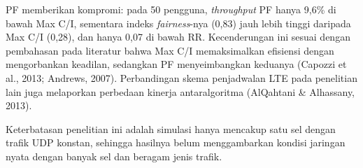 PF memberikan kompromi: pada 50 pengguna, \textit{throughput} PF hanya 9,6\% di bawah Max C/I, sementara indeks \textit{fairness}-nya (0,83) jauh lebih tinggi daripada Max C/I (0,28), dan hanya 0,07 di bawah RR. Kecenderungan ini sesuai dengan pembahasan pada literatur bahwa Max C/I memaksimalkan efisiensi dengan mengorbankan keadilan, sedangkan PF menyeimbangkan keduanya (Capozzi et al., 2013; Andrews, 2007). Perbandingan skema penjadwalan LTE pada penelitian lain juga melaporkan perbedaan kinerja antaralgoritma (AlQahtani \& Alhassany, 2013).

Keterbatasan penelitian ini adalah simulasi hanya mencakup satu sel dengan trafik UDP konstan, sehingga hasilnya belum menggambarkan kondisi jaringan nyata dengan banyak sel dan beragam jenis trafik.
